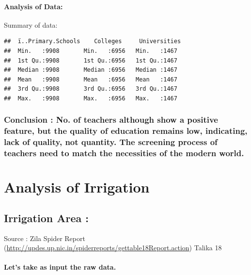 \documentclass[]{article}
\let\oldparagraph\paragraph
\renewcommand{\paragraph}[1]{\oldparagraph{#1}\mbox{}}
\begin{document}
\paragraph{Analysis of Data:}\label{analysis-of-data-5}

Summary of data:

\begin{verbatim}
##  ï..Primary.Schools    Colleges     Universities 
##  Min.   :9908       Min.   :6956   Min.   :1467  
##  1st Qu.:9908       1st Qu.:6956   1st Qu.:1467  
##  Median :9908       Median :6956   Median :1467  
##  Mean   :9908       Mean   :6956   Mean   :1467  
##  3rd Qu.:9908       3rd Qu.:6956   3rd Qu.:1467  
##  Max.   :9908       Max.   :6956   Max.   :1467
\end{verbatim}

\subsubsection{\texorpdfstring{\textbf{Conclusion} : No. of teachers
although show a positive feature, but the quality of education remains
low, indicating, lack of quality, not quantity. The screening process of
teachers need to match the necessities of the modern
world.}{Conclusion : No. of teachers although show a positive feature, but the quality of education remains low, indicating, lack of quality, not quantity. The screening process of teachers need to match the necessities of the modern world.}}\label{conclusion-no.-of-teachers-although-show-a-positive-feature-but-the-quality-of-education-remains-low-indicating-lack-of-quality-not-quantity.-the-screening-process-of-teachers-need-to-match-the-necessities-of-the-modern-world.}

\section{Analysis of Irrigation}\label{analysis-of-irrigation}

\subsection{Irrigation Area :}\label{irrigation-area}

Source : Zila Spider Report
(\url{http://updes.up.nic.in/spiderreports/gettable18Report.action})
Talika 18

\paragraph{Let's take as input the raw
data.}\label{lets-take-as-input-the-raw-data.-6}
\end{document}
